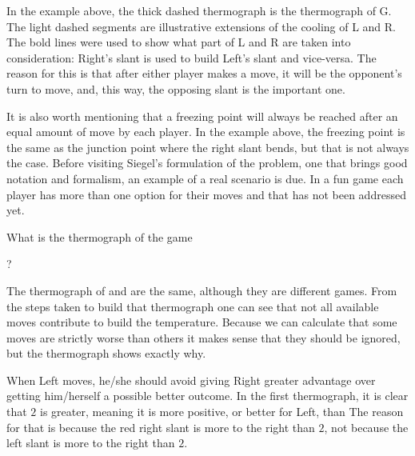 

In the example above, the thick dashed thermograph is the thermograph of G. The light dashed segments are illustrative extensions of the cooling of L and R. The bold lines were used to show what part of L and R are taken into consideration: Right's slant is used to build Left's slant and vice-versa. The reason for this is that after either player makes a move, it will be the opponent's turn to move, and, this way, the opposing slant is the important one.

It is also worth mentioning that a freezing point will always be reached after an equal amount of move by each player. In the example above, the freezing point is the same as the junction point where the right slant bends, but that is not always the case. Before visiting Siegel's formulation of the problem, one that brings good notation and formalism, an example of a real scenario is due. In a fun game each player has more than one option for their moves and that has not been addressed yet.

What is the thermograph of the game \Gm{=}
	 ? 







The thermograph of \Gm{} and  are the same, although they are different games. From the steps taken to build that thermograph one can see that not all available moves contribute to build the temperature. Because we can calculate that some moves are strictly worse than others it makes sense that they should be ignored, but the thermograph shows exactly why.

When Left moves, he/she should avoid giving Right greater advantage over getting him/herself a possible better outcome. In the first thermograph, it is clear that $2$ is greater, meaning it is more positive, or better for Left, than  The reason for that is because the red right slant is more to the right than $2$, not because the left slant is more to the right than $2$.

